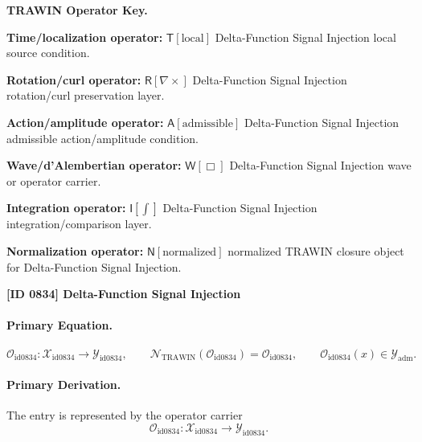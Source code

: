 \par\vspace{0.45\baselineskip}
\noindent\begin{minipage}[t]{\linewidth}
\begingroup
\small
\raggedright
\textbf{TRAWIN Operator Key.}\par
\noindent\textbf{Time/localization operator:} $\mathsf{T}\!\left[\mathrm{local}\right]$ Delta-Function Signal Injection local source condition.\par
\noindent\textbf{Rotation/curl operator:} $\mathsf{R}\!\left[\nabla\times\right]$ Delta-Function Signal Injection rotation/curl preservation layer.\par
\noindent\textbf{Action/amplitude operator:} $\mathsf{A}\!\left[\mathrm{admissible}\right]$ Delta-Function Signal Injection admissible action/amplitude condition.\par
\noindent\textbf{Wave/d'Alembertian operator:} $\mathsf{W}\!\left[\Box\right]$ Delta-Function Signal Injection wave or operator carrier.\par
\noindent\textbf{Integration operator:} $\mathsf{I}\!\left[\int\right]$ Delta-Function Signal Injection integration/comparison layer.\par
\noindent\textbf{Normalization operator:} $\mathsf{N}\!\left[\mathrm{normalized}\right]$ normalized TRAWIN closure object for Delta-Function Signal Injection.\par
\endgroup
\end{minipage}

\clearpage
\noindent\textbf{[ID 0834] Delta-Function Signal Injection}\par
\vspace{0.35em}
\paragraph{Primary Equation.}
\[
\mathcal{O}_{\mathrm{id0834}}:\mathcal{X}_{\mathrm{id0834}}\longrightarrow \mathcal{Y}_{\mathrm{id0834}},\qquad
\mathcal{N}_{\mathrm{TRAWIN}}(\mathcal{O}_{\mathrm{id0834}})=\mathcal{O}_{\mathrm{id0834}},\qquad
\mathcal{O}_{\mathrm{id0834}}(x)\in\mathcal{Y}_{\mathrm{adm}}.
\]

\paragraph{Primary Derivation.} The entry is represented by the operator carrier\[
\mathcal{O}_{\mathrm{id0834}}:\mathcal{X}_{\mathrm{id0834}}\longrightarrow \mathcal{Y}_{\mathrm{id0834}}.
\]

